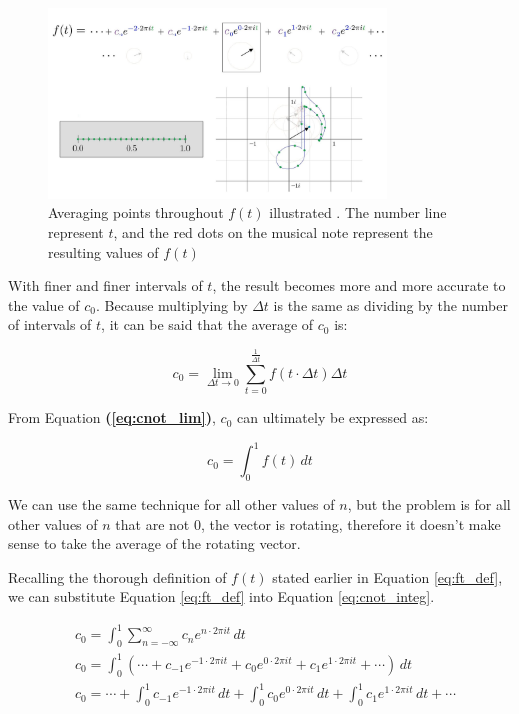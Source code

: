 \documentclass[letterpaper, 12pt]{article}
\begin{document}
\begin{figure}[H]
    \centering
    \includegraphics[width=0.8\textwidth]{cnot_integ.jpeg}
    \caption{Averaging points throughout \protect\(f(t)\) illustrated \protect\cite{sandersonWhatFourierSeries2019}. The number line represent \protect\(t\), and the red dots on the musical note represent the resulting values of \protect\(f(t)\)}
    \label{fig:cnot_integ}
\end{figure}

With finer and finer intervals of \(t\), the result
becomes more and more accurate to the value of \(c_0\).
Because multiplying by \(\Delta t\) is the same as dividing by the number
of intervals of \(t\),
it can be
said that the average of \(c_0\) is:

\begin{equation}
    c_0 = \lim_{\Delta t \to 0} \sum_{t = 0}^{\frac{1}{\Delta t}} f(t \cdot \Delta t) \Delta t
    \label{eq:cnot_lim}
\end{equation}

From Equation \textbf{(\ref*{eq:cnot_lim})}, \(c_0\) can ultimately be expressed as:

\begin{equation}
    c_0 = \int_{0}^{1} f(t) \,dt
    \label{eq:cnot_integ}
\end{equation}


We can use the same technique for all other values of \(n\), but the problem is
for all other values of \(n\) that are not 0, the vector is rotating, therefore
it doesn't make sense to take the average of the rotating vector.

Recalling the thorough definition of \(f(t)\) stated earlier in Equation \ref*{eq:ft_def},
we can substitute Equation \ref*{eq:ft_def} into Equation \ref*{eq:cnot_integ}.

\begin{align*}
     & c_0 = \int_{0}^{1} \sum_{n=-\infty}^{\infty} c_n e^{n \cdot 2\pi it} \,dt
    \\
     & c_0 = \int_{0}^{1} \left( \cdots + c_{-1} e^{-1 \cdot 2\pi it} + c_{0} e^{0 \cdot 2\pi it} + c_{1} e^{1 \cdot 2\pi it} + \cdots \right) \,dt
    \\
     & c_0 = \cdots + \int_{0}^{1} c_{-1} e^{-1 \cdot 2\pi it} \,dt + \int_{0}^{1} c_{0} e^{0 \cdot 2\pi it} \,dt + \int_{0}^{1} c_{1} e^{1 \cdot 2\pi it} \,dt + \cdots
\end{align*}
\end{document}
